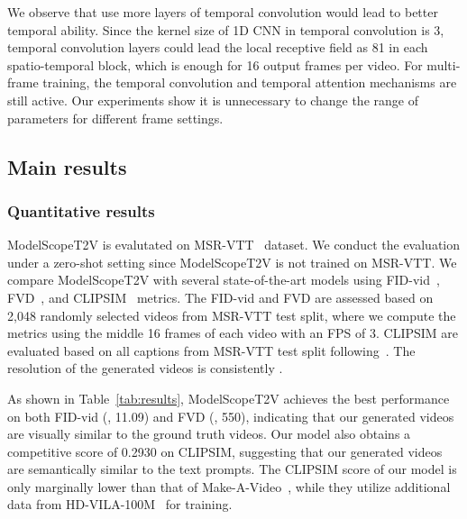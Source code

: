 We observe that use more layers of temporal convolution would lead to better temporal ability. Since the kernel size of 1D CNN in temporal convolution is 3,  temporal convolution layers could lead the local receptive field as 81 in each spatio-temporal block, which is enough for 16 output frames per video. For multi-frame training, the temporal convolution and temporal attention mechanisms are still active. Our experiments show it is unnecessary to change the range of parameters for different frame settings.

\subsection{Main results}

\subsubsection{Quantitative results}
ModelScopeT2V is evalutated on MSR-VTT~\cite{xu2016msr-vtt} dataset. 
We conduct the evaluation under a zero-shot setting since ModelScopeT2V is not trained on MSR-VTT. 
We compare ModelScopeT2V with several state-of-the-art models using FID-vid~\cite{heusel2017gans_nash_equilibrium}, FVD~\cite{unterthiner2018FVD}, and CLIPSIM~\cite{wu2021godiva} metrics. 
The FID-vid and FVD are assessed based on 2,048 randomly selected videos from MSR-VTT test split, where we compute the metrics using the middle 16 frames of each video with an FPS of 3. 
CLIPSIM are evaluated based on all captions from MSR-VTT test split following~\cite{singer2022make-a-video}.
The resolution of the generated videos is consistently .

As shown in Table~\ref{tab:results}, ModelScopeT2V achieves the best performance on both FID-vid (\ie, 11.09) and FVD (\ie, 550), indicating that our generated videos are visually similar to the ground truth videos.
Our model also obtains a competitive score of 0.2930 on CLIPSIM, suggesting that our generated videos are semantically similar to the text prompts. 
The CLIPSIM score of our model is only marginally lower than that of Make-A-Video~\cite{singer2022make-a-video}, while they utilize additional data from HD-VILA-100M~\cite{xue2022HD-VILA-100M} for training. 


